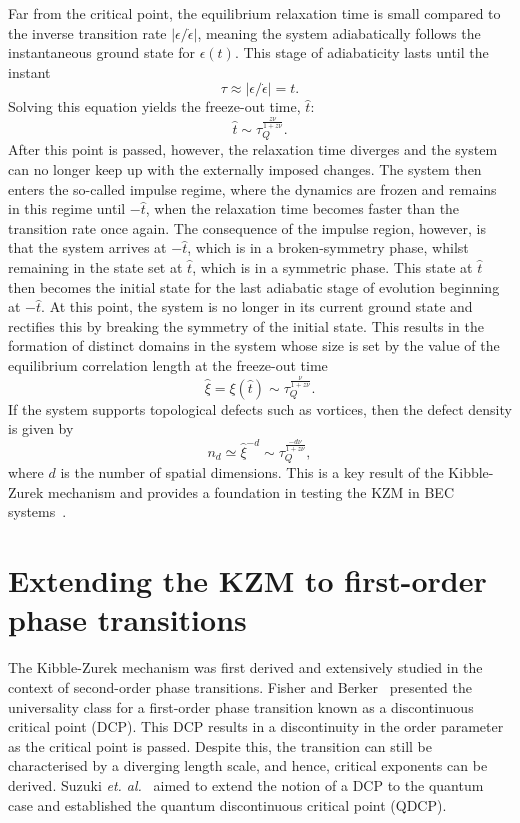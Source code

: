 Far from the critical point, the equilibrium relaxation time is small compared
to the inverse transition rate $|\epsilon/\dot{\epsilon}|$, meaning the system
adiabatically follows the instantaneous ground state for $\epsilon(t)$.
This stage of adiabaticity lasts until the instant
\begin{equation}
    \tau \approx |\epsilon/\dot{\epsilon}|=t.
\end{equation}
Solving this equation yields the freeze-out time, $\hat{t}$:
\begin{equation}
    \hat{t} \sim \tau_Q^\frac{z\nu}{1 + z\nu}.
\end{equation}
After this point is passed, however, the relaxation time diverges and the system
can no longer keep up with the externally imposed changes.
The system then enters the so-called impulse regime, where the dynamics are
frozen and remains in this regime until $-\hat{t}$, when the relaxation
time becomes faster than the transition rate once again.
The consequence of the impulse region, however, is that the system arrives at
$-\hat{t}$, which is in a broken-symmetry phase, whilst remaining
in the state set at $\hat{t}$, which is in a symmetric phase.
This state at $\hat{t}$ then becomes the initial state for the last adiabatic
stage of evolution beginning at $-\hat{t}$.
At this point, the system is no longer in its current ground state and rectifies
this by breaking the symmetry of the initial state.
This results in the formation of distinct domains in the system whose size is
set by the value of the equilibrium correlation length at the freeze-out time
\begin{equation}
    \hat{\xi}=\xi(\hat{t}) \sim \tau_Q^{\frac{\nu}{1 + z\nu}}.
\end{equation}
If the system supports topological defects such as vortices, then the defect
density is given by
\begin{equation}
    n_d \simeq \hat{\xi}^{-d} \sim \tau_Q^{\frac{-d\nu}{1+z\nu}},
\end{equation}
where $d$ is the number of spatial dimensions.
This is a key result of the Kibble-Zurek mechanism and provides a
foundation in testing the KZM in BEC systems~\cite{Damski2007, Swislocki2013,
Anquez2016, Saito2007_1, Saito2007_2}.

\section{Extending the KZM to first-order phase transitions}
The Kibble-Zurek mechanism was first derived and extensively studied in the
context of second-order phase transitions.
Fisher and Berker~\cite{Fisher1982} presented the universality class for
a first-order phase transition known as a discontinuous critical point (DCP).
This DCP results in a discontinuity in the order parameter as the critical point
is passed.
Despite this, the transition can still be characterised by a diverging length
scale, and hence, critical exponents can be derived.
Suzuki {\it et. al.}~\cite{Suzuki2015} aimed to extend the notion of a DCP to
the quantum case and established the quantum discontinuous critical point
(QDCP).

